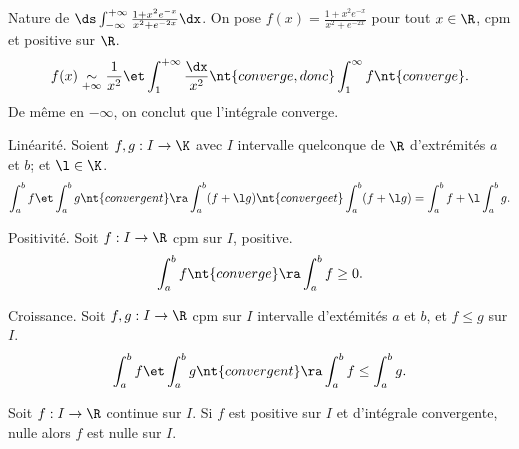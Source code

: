 \documentclass[11pt]{article}
\begin{document}
\begin{ex}{}{}
    Nature de $\ds\int_{-\infty}^{+\infty}\frac{1+x^2e^{-x}}{x^2+e^{-2x}}\dx$.
    \tcblower
    On pose $f(x)=\frac{1+x^2e^{-x}}{x^2+e^{-2x}}$ pour tout $x\in\R$, cpm et positive sur $\R$.
    \begin{equation*}
        f(x)\underset{+\infty}{\sim}\frac{1}{x^2} \et \int_1^{+\infty}\frac{\dx}{x^2} \nt{ converge, donc } \int_1^\infty f \nt{ converge}.
    \end{equation*}
    De même en $-\infty$, on conclut que l'intégrale converge.
\end{ex}

\begin{prop}{Linéarité.}{}
    Soient $f,g:I\to\K$ avec $I$ intervalle quelconque de $\R$ d'extrémités $a$ et $b$; et $\l\in\K$.
    \begin{equation*}
        \int_a^b f \et \int_a^b g \nt{ convergent} \ra \int_a^b(f+\l g) \nt{ converge et } \int_a^b(f+\l g) = \int_a^b f + \l\int_a^b g.
    \end{equation*}
\end{prop}

\begin{prop}{Positivité.}{}
    Soit $f:I\to\R$ cpm sur $I$, positive.
    \begin{equation*}
        \int_a^b f \nt{ converge } \ra \int_a^b f \geq 0.
    \end{equation*}
\end{prop}

\begin{prop}{Croissance.}{}
    Soit $f,g:I\to\R$ cpm sur $I$ intervalle d'extémités $a$ et $b$, et $f\leq g$ sur $I$.
    \begin{equation*}
        \int_a^b f \et \int_a^b g \nt{ convergent } \ra \int_a^b f \leq \int_a^b g.
    \end{equation*}
\end{prop}

\begin{prop}{}{}
    Soit $f:I\to \R$ continue sur $I$. Si $f$ est positive sur $I$ et d'intégrale convergente, nulle alors $f$ est nulle sur $I$.
\end{prop}
\end{document}
